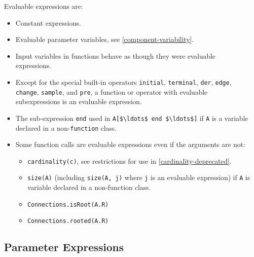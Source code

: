 Evaluable expressions are:
\begin{itemize}
\item
  Constant expressions.
\item
  Evaluable parameter variables, see \cref{component-variability}.
\item
  Input variables in functions behave as though they were evaluable expressions.
\item
  Except for the special built-in operators \lstinline!initial!, \lstinline!terminal!, \lstinline!der!, \lstinline!edge!, \lstinline!change!, \lstinline!sample!, and \lstinline!pre!, a function or operator with evaluable subexpressions is an evaluable expression.
\item
  The sub-expression \lstinline!end! used in \lstinline!A[$\ldots$ end $\ldots$]! if \lstinline!A! is a variable declared in a non-\lstinline!function! class.
\item
  Some function calls are evaluable expressions even if the arguments are not:
  \begin{itemize}
  \item
    \lstinline!cardinality(c)!, see restrictions for use in \cref{cardinality-deprecated}.
  \item
    \lstinline!size(A)! (including \lstinline!size(A, j)! where \lstinline!j! is an evaluable expression) if \lstinline!A! is variable declared in a non-function class.
  \item
    \lstinline!Connections.isRoot(A.R)!
  \item
    \lstinline!Connections.rooted(A.R)!
  \end{itemize}
\end{itemize}

\subsection{Parameter Expressions}\label{parameter-expressions}

